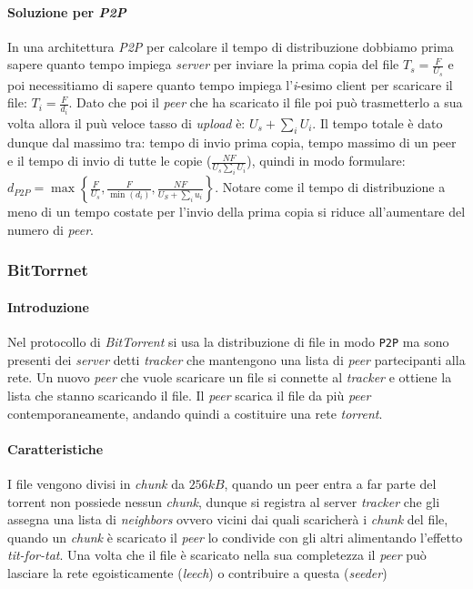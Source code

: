         \paragraph{Soluzione per \textit{P2P}} In una architettura \textit{P2P} per calcolare il tempo di distribuzione dobbiamo prima sapere quanto tempo impiega \textit{server} per inviare la prima copia del file $ T_s = \frac{F}{U_s} $ e poi necessitiamo di sapere quanto tempo impiega l'\textit{i}-esimo client per scaricare il file: $T_i= \frac{F}{d_i} $. Dato che poi il \textit{peer} che ha scaricato il file poi può trasmetterlo a sua volta allora il puù veloce tasso di \textit{upload} è: $U_s+\sum_iU_i $. Il tempo totale è dato dunque dal massimo tra: tempo di invio prima copia, tempo massimo di un peer e il tempo di invio di tutte le copie ($\frac{NF}{U_s\sum_iU_i} $), quindi in modo formulare: $ d_{P2P}=\max\left\{\frac{F}{U_s}, \frac{F}{\min(d_i)}, \frac{NF}{U_S+\sum_iu_i}\right\} $. Notare come il tempo di distribuzione a meno di un tempo costate per l'invio della prima copia si riduce all'aumentare del numero di \textit{peer}.
        \subsubsection{BitTorrnet}
            \paragraph{Introduzione} Nel protocollo di \textit{BitTorrent} si usa la distribuzione di file in modo \texttt{P2P} ma sono presenti dei \textit{server} detti \textit{tracker} che mantengono una lista di \textit{peer} partecipanti alla rete. Un nuovo \textit{peer} che vuole scaricare un file si connette al \textit{tracker} e ottiene la lista che stanno scaricando il file. Il \textit{peer} scarica il file da più \textit{peer} contemporaneamente, andando quindi a costituire una rete \textit{torrent}.
            \paragraph{Caratteristiche} I file vengono divisi in \textit{chunk} da $ 256kB $, quando un peer entra a far parte del torrent non possiede nessun \textit{chunk}, dunque si registra al server \textit{tracker} che gli assegna una lista di \textit{neighbors} ovvero vicini dai quali scaricherà i \textit{chunk} del file, quando un \textit{chunk} è scaricato il \textit{peer} lo condivide con gli altri alimentando l'effetto \textit{tit-for-tat}. Una volta che il file è scaricato nella sua completezza il \textit{peer} può lasciare la rete egoisticamente (\textit{leech}) o contribuire a questa (\textit{seeder})

